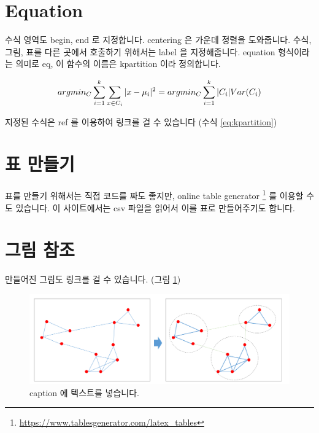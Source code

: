 \documentclass[11pt]{article}
\begin{document}
\section{Equation}

수식 영역도 begin, end 로 지정합니다.
centering 은 가운데 정렬을 도와줍니다.
수식, 그림, 표를 다른 곳에서 호출하기 위해서는 label 을 지정해줍니다.
equation 형식이라는 의미로 eq, 이 함수의 이름은 kpartition 이라 정의합니다.

\begin{equation}
\label{eq:kpartition}
\centering
arg min_C\sum_{i=1}^{k} \sum_{x \in C_i} \vert x - \mu_i \vert^2 = arg min_C \sum_{i=1}^{k} \vert C_i \vert Var(C_i)
\end{equation}

지정된 수식은 ref 를 이용하여 링크를 걸 수 있습니다 (수식 \ref{eq:kpartition})

\section{표 만들기}

표를 만들기 위해서는 직접 코드를 짜도 좋지만, online table generator \footnote{\url{https://www.tablesgenerator.com/latex_tables}} 를 이용할 수도 있습니다. 
이 사이트에서는 csv 파일을 읽어서 이를 표로 만들어주기도 합니다.

\section{그림 참조}

만들어진 그림도 링크를 걸 수 있습니다. (그림 \ref{fig:community_detection})

\begin{figure}[ht]
\centering
\includegraphics[keepaspectratio=true, width=0.5\linewidth]{figures/community_detection.png}
\caption{caption 에 텍스트를 넣습니다.}
\label{fig:community_detection}
\end{figure}

\end{document}
